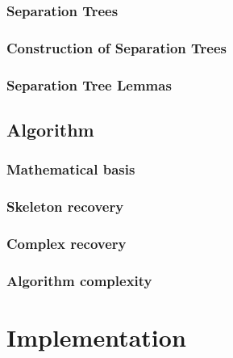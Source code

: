 \documentclass{pracamgr}
\theoremstyle{definition}
\begin{document}
		\subsection{Separation Trees} \label{subsec:SepTrees}
			
			
		\subsection{Construction of Separation Trees} \label{subsec:SepTreesConstruct}
						

		\subsection{Separation Tree Lemmas}			
			
		
	\section{Algorithm}
		
			
		\subsection{Mathematical basis} \label{subsec:LCDMathBasis}
				
	
		\subsection{Skeleton recovery} \label{subsec:LCDSkeletonRecovery}
				
	
		\subsection{Complex recovery} \label{subsec:LCDComplexRecovery}
			
	
		\subsection{Algorithm complexity} \label{subsec:LCDAlgComplex}
			
			
\chapter{Implementation}
	
\end{document}

